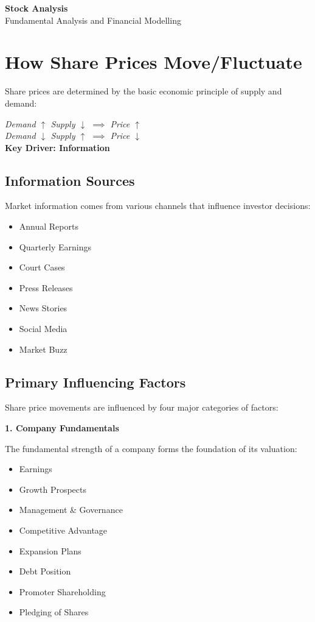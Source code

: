 \documentclass[12pt]{article}
\begin{document}
\begin{center}
{\Large \textbf{Stock Analysis}}\\[0.5em]
{\large Fundamental Analysis and Financial Modelling}
\end{center}

\section{How Share Prices Move/Fluctuate}

Share prices are determined by the basic economic principle of supply and demand:

\begin{center}
\textit{Demand $\uparrow$ Supply $\downarrow$ $\implies$ Price $\uparrow$}\\
\textit{Demand $\downarrow$ Supply $\uparrow$ $\implies$ Price $\downarrow$}\\[0.5em]
\textbf{Key Driver: Information}
\end{center}

\subsection{Information Sources}

Market information comes from various channels that influence investor decisions:

\begin{itemize}
\item Annual Reports
\item Quarterly Earnings
\item Court Cases
\item Press Releases
\item News Stories
\item Social Media
\item Market Buzz
\end{itemize}

\subsection{Primary Influencing Factors}

Share price movements are influenced by four major categories of factors:

\textbf{1. Company Fundamentals}

The fundamental strength of a company forms the foundation of its valuation:
\begin{itemize}
\item Earnings
\item Growth Prospects
\item Management \& Governance
\item Competitive Advantage
\item Expansion Plans
\item Debt Position
\item Promoter Shareholding
\item Pledging of Shares
\end{itemize}
\end{document}
